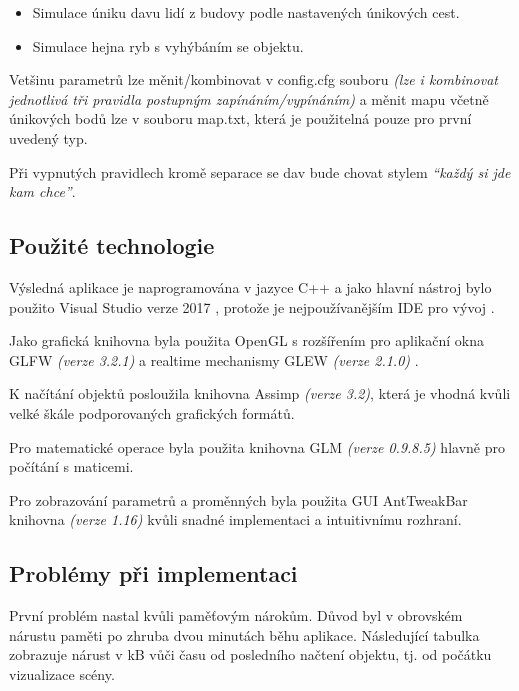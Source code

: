 \documentclass[czech,public,dept460,male,cpdeclaration]{diploma}
\begin{document}
\begin{itemize}
	\item Simulace úniku davu lidí z budovy podle nastavených únikových cest.
	\item Simulace hejna ryb s vyhýbáním se objektu.
\end{itemize}

Vetšinu parametrů lze měnit/kombinovat v config.cfg souboru \textit{(lze i kombinovat jednotlivá tři pravidla postupným zapínáním/vypínáním)} a měnit mapu včetně únikových bodů lze v souboru map.txt, která je použitelná pouze pro první uvedený typ.

Při vypnutých pravidlech kromě separace se dav bude chovat stylem \textit{``každý si jde kam chce''}.

\subsection{Použité technologie}
Výsledná aplikace je naprogramována v jazyce C++ a jako hlavní nástroj bylo použito Visual Studio verze 2017 \cite{linkToVisualStudio}, protože je nejpoužívanějším IDE pro vývoj \cite{linkToTopIDE}. 

Jako grafická knihovna byla použita OpenGL \cite{linkToOpenGL} s rozšířením pro aplikační okna GLFW \textit{(verze 3.2.1)} \cite{linkToGLFW} a realtime mechanismy GLEW \textit{(verze 2.1.0)} \cite{linkToGLew}.

K načítání objektů posloužila knihovna Assimp \cite{linkToAssimp} \textit{(verze 3.2)}, která je vhodná kvůli velké škále podporovaných grafických formátů.

Pro matematické operace byla použita knihovna GLM \cite{linkToGLM} \textit{(verze 0.9.8.5)} hlavně pro počítání s maticemi.

Pro zobrazování parametrů a proměnných byla použita GUI AntTweakBar knihovna \textit{(verze 1.16)} \cite{linkToAntTweakBar} kvůli snadné implementaci a intuitivnímu rozhraní.

\subsection{Problémy při implementaci}\label{sec:problemy-pri-implementaci}

První problém nastal kvůli paměťovým nárokům. Důvod byl v obrovském nárustu paměti po zhruba dvou minutách běhu aplikace. Následující tabulka zobrazuje nárust v kB vůči času od posledního načtení objektu, tj. od počátku vizualizace scény.
\end{document}
